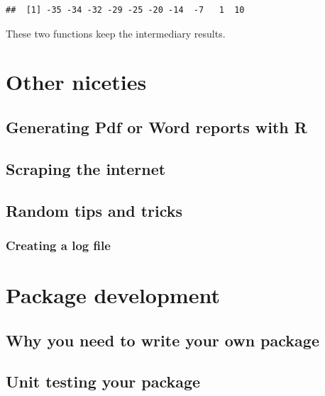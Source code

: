 \documentclass[]{gitbook}
\theoremstyle{definition}
\theoremstyle{definition}
\theoremstyle{definition}
\theoremstyle{remark}
\begin{document}
\begin{verbatim}
##  [1] -35 -34 -32 -29 -25 -20 -14  -7   1  10
\end{verbatim}

These two functions keep the intermediary results.

\hypertarget{other-niceties}{%
\section{Other niceties}\label{other-niceties}}

\hypertarget{generating-pdf-or-word-reports-with-r}{%
\subsection{Generating Pdf or Word reports with
R}\label{generating-pdf-or-word-reports-with-r}}

\hypertarget{scraping-the-internet}{%
\subsection{Scraping the internet}\label{scraping-the-internet}}

\hypertarget{random-tips-and-tricks}{%
\subsection{Random tips and tricks}\label{random-tips-and-tricks}}

\hypertarget{creating-a-log-file}{%
\subsubsection{Creating a log file}\label{creating-a-log-file}}

\hypertarget{package-development}{%
\section{Package development}\label{package-development}}

\hypertarget{why-you-need-to-write-your-own-package}{%
\subsection{Why you need to write your own
package}\label{why-you-need-to-write-your-own-package}}

\hypertarget{unit-testing-your-package}{%
\subsection{Unit testing your package}\label{unit-testing-your-package}}


\end{document}
